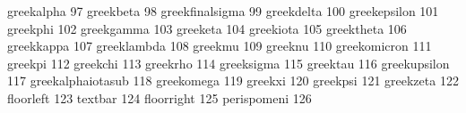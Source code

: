  greekalpha                         97
 greekbeta                          98
 greekfinalsigma                    99
 greekdelta                        100
 greekepsilon                      101
 greekphi                          102
 greekgamma                        103
 greeketa                          104
 greekiota                         105
 greektheta                        106
 greekkappa                        107
 greeklambda                       108
 greekmu                           109
 greeknu                           110
 greekomicron                      111
 greekpi                           112
 greekchi                          113
 greekrho                          114
 greeksigma                        115
 greektau                          116
 greekupsilon                      117
 greekalphaiotasub                 118
 greekomega                        119
 greekxi                           120
 greekpsi                          121
 greekzeta                         122
 floorleft                         123
 textbar                           124
 floorright                        125
 perispomeni                       126

